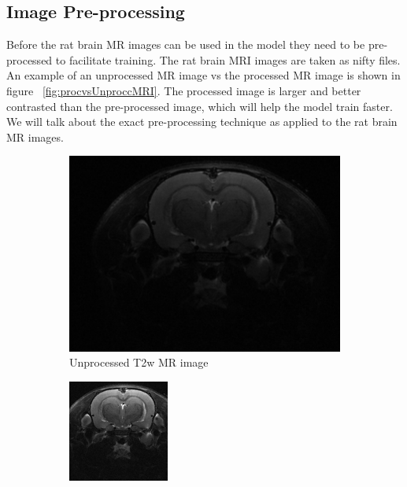     

\subsection{Image Pre-processing}
    Before the rat brain MR images can be used in the model they need to be pre-processed to facilitate training. 
    The rat brain MRI images are taken as nifty files. 
    An example of an unprocessed MR image vs the processed MR image is shown in figure ~\ref{fig:procvsUnproccMRI}.
    The processed image is larger and better contrasted than the pre-processed image, which will help the model train faster.
    We will talk about the exact pre-processing technique as applied to the rat brain MR images.
    
\begin{figure}
\centering
\begin{subfigure}{.5\textwidth}
  \centering
  \includegraphics[width=0.9\linewidth]{MRI_veh01.png}
  \caption{Unprocessed T2w MR image }
  \label{fig:unprocessedMRI}
\end{subfigure}%
\begin{subfigure}{.5\textwidth}
  \centering
  \includegraphics[width=0.8\linewidth]{post_MRI_veh01.png}

\end{subfigure}
\end{figure}

